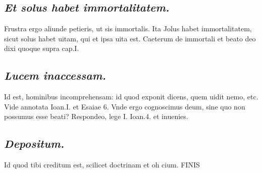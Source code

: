 \documentclass{article}
\begin{document}
\begin{pages}
\subsection*{\textit{Et solus habet immortalitatem. }}\pstart Frustra ergo aliunde petieris, ut sis immortalis. Ita Jolus habet immortalitatem, sicut solus habet uitam, qui et ipsa uita est. Caeterum de immortali et beato deo dixi quoque supra cap.I.  \pend
{}
{}
\subsection*{\textit{Lucem inaccessam. }}\pstart Id est, hominibus incomprehensam: id quod exponit dicens, quem uidit nemo, etc. Vide annotata Ioan.I. et Esaiae 6. Vnde ergo cognoscimus deum, sine quo non possumus esse beati? Respondeo, lege I. Ioan.4. et inuenies.  \pend
{}
{}
\subsection*{\textit{Depositum. }}\pstart Id quod tibi creditum est, scilicet doctrinam et oh cium.  \pend\pstart FINIS  \pend
\endnumbering
\end{pages}
\end{document}
